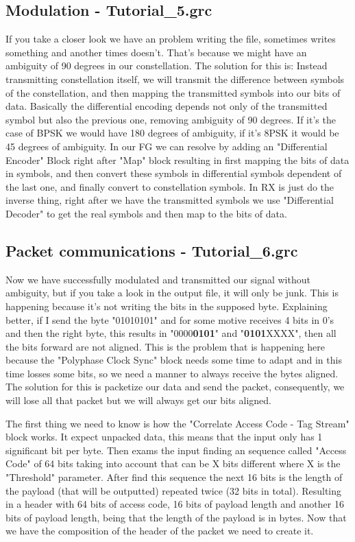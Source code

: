 \documentclass[a4paper, 10pt, conference]{ieeeconf}      %
\begin{document}
\subsection{Modulation - Tutorial\_5.grc}
    If you take a closer look we have an problem writing the file, sometimes writes something and another times doesn't. That's because we might have an ambiguity of 90 degrees in our constellation. The solution for this is: Instead transmitting constellation itself, we will transmit the difference between symbols of the constellation, and then mapping the transmitted symbols into our bits of data. Basically the differential encoding depends not only of the transmitted symbol but also the previous one, removing ambiguity of 90 degrees. If it's the case of BPSK we would have 180 degrees of ambiguity, if it's 8PSK it would be 45 degrees of ambiguity.
    In our FG we can resolve by adding an "Differential Encoder" Block right after "Map" block resulting in first mapping the bits of data in symbols, and then convert these symbols in differential symbols dependent of the last one, and finally convert to constellation symbols. 
    In RX is just do the inverse thing, right after we have the transmitted symbols we use "Differential Decoder" to get the real symbols and then map to the bits of data.
    
    
\subsection{Packet communications - Tutorial\_6.grc}
    Now we have successfully modulated and transmitted our signal without ambiguity, but if you take a look in the output file, it will only be junk. This is happening because it's not writing the bits in the supposed byte. Explaining better, if I send the byte "01010101" and for some motive receives 4 bits in 0's and then the right byte, this results in "0000\textbf{0101}" and "\textbf{0101}XXXX", then all the bits forward are not aligned. This is the problem that is happening here because the "Polyphase Clock Sync" block needs some time to adapt and in this time losses some bits, so we need a manner to always receive the bytes aligned. The solution for this is packetize our data and send the packet, consequently, we will lose all that packet but we will always get our bits aligned.
    
    The first thing we need to know is how the "Correlate Access Code - Tag Stream" block works. It expect unpacked data, this means that the input only has 1 significant bit per byte. Then exams the input finding an sequence called "Access Code" of 64 bits taking into account that can be X bits different where X is the "Threshold" parameter. After find this sequence the next 16 bits is the length of the payload (that will be outputted) repeated twice (32 bits in total). Resulting in a header with 64 bits of access code, 16 bits of payload length and another 16 bits of payload length, being that the length of the payload is in bytes. Now that we have the composition of the header of the packet we need to create it.
    
\end{document}

